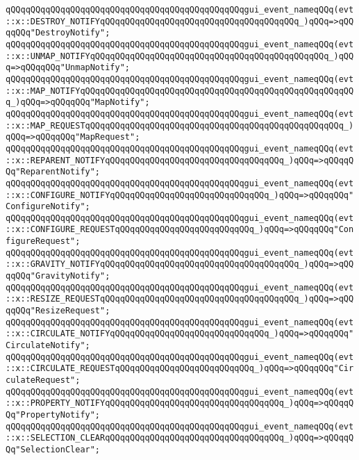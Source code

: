 \verb|qQQqqQQqqQQqqQQqqQQqqQQqqQQqqQQqqQQqqQQqqQQqqQQqgui_event_nameqQQq(evt::x::DESTROY_NOTIFYqQQqqQQqqQQqqQQqqQQqqQQqqQQqqQQqqQQqqQQq_)qQQq=>qQQqqQQq"DestroyNotify";|\newline
\verb|qQQqqQQqqQQqqQQqqQQqqQQqqQQqqQQqqQQqqQQqqQQqqQQqgui_event_nameqQQq(evt::x::UNMAP_NOTIFYqQQqqQQqqQQqqQQqqQQqqQQqqQQqqQQqqQQqqQQqqQQqqQQq_)qQQq=>qQQqqQQq"UnmapNotify";|\newline
\verb|qQQqqQQqqQQqqQQqqQQqqQQqqQQqqQQqqQQqqQQqqQQqqQQqgui_event_nameqQQq(evt::x::MAP_NOTIFYqQQqqQQqqQQqqQQqqQQqqQQqqQQqqQQqqQQqqQQqqQQqqQQqqQQqqQQq_)qQQq=>qQQqqQQq"MapNotify";|\newline
\verb|qQQqqQQqqQQqqQQqqQQqqQQqqQQqqQQqqQQqqQQqqQQqqQQqgui_event_nameqQQq(evt::x::MAP_REQUESTqQQqqQQqqQQqqQQqqQQqqQQqqQQqqQQqqQQqqQQqqQQqqQQqqQQq_)qQQq=>qQQqqQQq"MapRequest";|\newline
\verb|qQQqqQQqqQQqqQQqqQQqqQQqqQQqqQQqqQQqqQQqqQQqqQQqgui_event_nameqQQq(evt::x::REPARENT_NOTIFYqQQqqQQqqQQqqQQqqQQqqQQqqQQqqQQqqQQq_)qQQq=>qQQqqQQq"ReparentNotify";|\newline
\verb|qQQqqQQqqQQqqQQqqQQqqQQqqQQqqQQqqQQqqQQqqQQqqQQqgui_event_nameqQQq(evt::x::CONFIGURE_NOTIFYqQQqqQQqqQQqqQQqqQQqqQQqqQQqqQQq_)qQQq=>qQQqqQQq"ConfigureNotify";|\newline
\verb|qQQqqQQqqQQqqQQqqQQqqQQqqQQqqQQqqQQqqQQqqQQqqQQqgui_event_nameqQQq(evt::x::CONFIGURE_REQUESTqQQqqQQqqQQqqQQqqQQqqQQqqQQq_)qQQq=>qQQqqQQq"ConfigureRequest";|\newline
\verb|qQQqqQQqqQQqqQQqqQQqqQQqqQQqqQQqqQQqqQQqqQQqqQQqgui_event_nameqQQq(evt::x::GRAVITY_NOTIFYqQQqqQQqqQQqqQQqqQQqqQQqqQQqqQQqqQQqqQQq_)qQQq=>qQQqqQQq"GravityNotify";|\newline
\verb|qQQqqQQqqQQqqQQqqQQqqQQqqQQqqQQqqQQqqQQqqQQqqQQqgui_event_nameqQQq(evt::x::RESIZE_REQUESTqQQqqQQqqQQqqQQqqQQqqQQqqQQqqQQqqQQqqQQq_)qQQq=>qQQqqQQq"ResizeRequest";|\newline
\verb|qQQqqQQqqQQqqQQqqQQqqQQqqQQqqQQqqQQqqQQqqQQqqQQqgui_event_nameqQQq(evt::x::CIRCULATE_NOTIFYqQQqqQQqqQQqqQQqqQQqqQQqqQQqqQQq_)qQQq=>qQQqqQQq"CirculateNotify";|\newline
\verb|qQQqqQQqqQQqqQQqqQQqqQQqqQQqqQQqqQQqqQQqqQQqqQQqgui_event_nameqQQq(evt::x::CIRCULATE_REQUESTqQQqqQQqqQQqqQQqqQQqqQQqqQQq_)qQQq=>qQQqqQQq"CirculateRequest";|\newline
\verb|qQQqqQQqqQQqqQQqqQQqqQQqqQQqqQQqqQQqqQQqqQQqqQQqgui_event_nameqQQq(evt::x::PROPERTY_NOTIFYqQQqqQQqqQQqqQQqqQQqqQQqqQQqqQQqqQQq_)qQQq=>qQQqqQQq"PropertyNotify";|\newline
\verb|qQQqqQQqqQQqqQQqqQQqqQQqqQQqqQQqqQQqqQQqqQQqqQQqgui_event_nameqQQq(evt::x::SELECTION_CLEARqQQqqQQqqQQqqQQqqQQqqQQqqQQqqQQqqQQq_)qQQq=>qQQqqQQq"SelectionClear";|\newline
